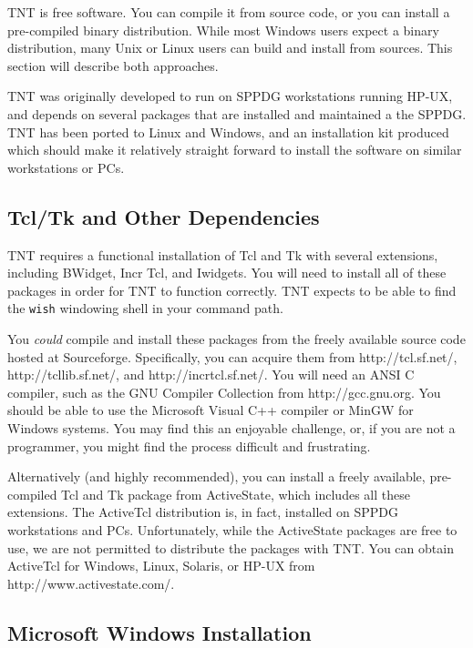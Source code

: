 \documentclass{article}
\begin{document}
TNT is free software.  You can compile it from source code, or you can
install a pre-compiled binary distribution.  While most
Windows users expect a binary distribution, many Unix or
Linux users can build and install from sources.  This section will
describe both approaches.

TNT was originally developed to run on SPPDG workstations running
HP-UX, and depends on several packages that are installed and
maintained a the SPPDG.  TNT has been ported to Linux and
Windows, and an installation kit produced which should
make it relatively straight forward to install the software on similar
workstations or PCs.


\subsection {Tcl/Tk and Other Dependencies}

TNT requires a functional installation of Tcl and Tk with several
extensions, including BWidget, Incr Tcl, and Iwidgets.  You
will need to install all of these packages in order for TNT to
function correctly.  TNT expects to be able to find the {\tt wish}
windowing shell in your command path.

You {\em could} compile and install these packages from the freely
available source code hosted at Sourceforge.  Specifically, you can
acquire them from http://tcl.sf.net/, http://tcllib.sf.net/, and
http://incrtcl.sf.net/.  You will need an ANSI C compiler, such as the
GNU Compiler Collection from http://gcc.gnu.org.  You should be able
to use the Microsoft Visual C++ compiler or MinGW for Windows systems.
You may find this an enjoyable challenge, or, if you are not a
programmer, you might find the process difficult and frustrating.

Alternatively (and highly recommended), you can install a freely
available, pre-compiled Tcl and Tk package from ActiveState, which
includes all these extensions.  The ActiveTcl distribution is, in
fact, installed on SPPDG workstations and PCs.  Unfortunately, while
the ActiveState packages are free to use, we are not permitted to
distribute the packages with TNT.  You can obtain ActiveTcl for
Windows, Linux, Solaris, or
HP-UX from http://www.activestate.com/.



\subsection {Microsoft Windows Installation}
\end{document}
